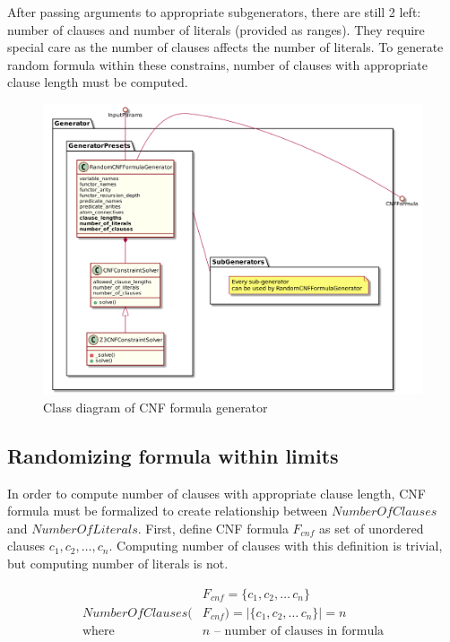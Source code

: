 After passing arguments to appropriate subgenerators, there are still 2 left: number of clauses and number of literals (provided as ranges). They require special care as the number of clauses affects the number of literals. To generate random formula within these constrains, number of clauses with appropriate clause length must be computed.

\begin{figure}[h]
\begin{centering}
  \includegraphics[width=\textwidth]{logic-formula-generator/cnf_formula_generator.png}
  \caption{Class diagram of CNF formula generator}
  \label{pic:cnf_generator_class_diagram}
\end{centering}
\end{figure}

\subsection{Randomizing formula within limits}
\label{sec:RandomizeFormulaWithinLimits}

In order to compute number of clauses with appropriate clause length, CNF formula must be formalized to create relationship between $NumberOfClauses$ and $NumberOfLiterals$.
First, define CNF formula $F_{cnf}$ as set of unordered clauses $c_1, c_2, \dots, c_n$. Computing number of clauses with this definition is trivial, but computing number of literals is not.

\begin{align*}
	&F_{cnf} = \{c_1, c_2, \dots\, c_n\}  \\
  NumberOfClauses(&F_{cnf}) = |\{c_1, c_2, \dots\, c_n\}| = n \\
	\text{where }
		&n \text{ -- number of clauses in formula}
\end{align*}


